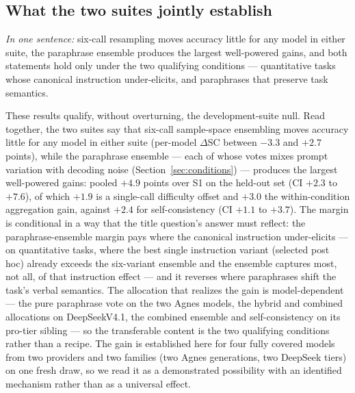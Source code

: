 \subsection{What the two suites jointly establish}
\label{sec:heldoutjoint}

\emph{In one sentence:} six-call resampling moves accuracy little for any model in either suite, the paraphrase ensemble produces the largest well-powered gains, and both statements hold only under the two qualifying conditions --- quantitative tasks whose canonical instruction under-elicits, and paraphrases that preserve task semantics.

These results qualify, without overturning, the development-suite null. Read together, the two suites say that six-call sample-space ensembling moves accuracy little for any model in either suite (per-model $\Delta$SC between $-3.3$ and $+2.7$ points), while the paraphrase ensemble --- each of whose votes mixes prompt variation with decoding noise (Section~\ref{sec:conditions}) --- produces the largest well-powered gains: pooled $+4.9$ points over S1 on the held-out set (CI $+2.3$ to $+7.6$), of which $+1.9$ is a single-call difficulty offset and $+3.0$ the within-condition aggregation gain, against $+2.4$ for self-consistency (CI $+1.1$ to $+3.7$). The margin is conditional in a way that the title question's answer must reflect: the paraphrase-ensemble margin pays where the canonical instruction under-elicits --- on quantitative tasks, where the best single instruction variant (selected post hoc) already exceeds the six-variant ensemble and the ensemble captures most, not all, of that instruction effect --- and it reverses where paraphrases shift the task's verbal semantics. The allocation that realizes the gain is model-dependent --- the pure paraphrase vote on the two Agnes models, the hybrid and combined allocations on DeepSeekV4.1, the combined ensemble and self-consistency on its pro-tier sibling --- so the transferable content is the two qualifying conditions rather than a recipe. The gain is established here for four fully covered models from two providers and two families (two Agnes generations, two DeepSeek tiers) on one fresh draw, so we read it as a demonstrated possibility with an identified mechanism rather than as a universal effect.

